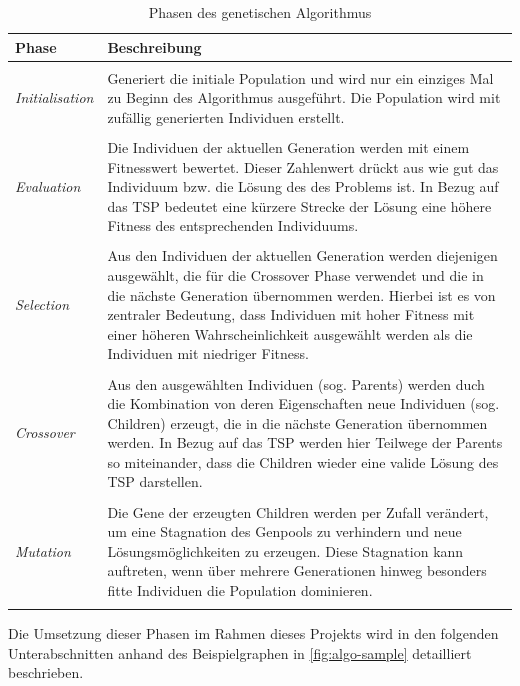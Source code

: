 \documentclass[12pt,a4paper]{scrreprt}
\begin{document}
\begin{center}
\begin{longtable}{p{3.0cm} p{10cm}}

Phase & Beschreibung \\
\hline \\
\textit{Initialisation} & Generiert die initiale Population und wird nur ein einziges Mal zu Beginn des Algorithmus ausgeführt. Die Population wird mit zufällig generierten Individuen erstellt.\\
 & \\
\textit{Evaluation} &  Die Individuen der aktuellen Generation werden mit einem Fitnesswert bewertet. Dieser Zahlenwert drückt aus wie gut das Individuum bzw. die Lösung des des Problems ist. In Bezug auf das TSP bedeutet eine kürzere Strecke der Lösung eine höhere Fitness des entsprechenden Individuums.\\
 & \\
\textit{Selection} & Aus den Individuen der aktuellen Generation werden diejenigen ausgewählt, die für die Crossover Phase verwendet und die in die nächste Generation übernommen werden. Hierbei ist es von zentraler Bedeutung, dass Individuen mit hoher Fitness mit einer höheren Wahrscheinlichkeit ausgewählt werden als die Individuen mit niedriger Fitness.\\
 & \\
\textit{Crossover} & Aus den ausgewählten Individuen (sog. Parents) werden duch die Kombination von deren Eigenschaften neue Individuen (sog. Children) erzeugt, die in die nächste Generation übernommen werden. In Bezug auf das TSP werden hier Teilwege der Parents so miteinander, dass die Children wieder eine valide Lösung des TSP darstellen.\\
 & \\
\textit{Mutation} & Die Gene der erzeugten Children werden per Zufall verändert, um eine Stagnation des Genpools zu verhindern und neue Lösungsmöglichkeiten zu erzeugen. Diese Stagnation kann auftreten, wenn über mehrere Generationen hinweg besonders fitte Individuen die Population dominieren.\\

\caption{Phasen des genetischen Algorithmus}
\label{tbl:phasen-algorithmus}
\end{longtable}
\end{center}

Die Umsetzung dieser Phasen im Rahmen dieses Projekts wird in den folgenden Unterabschnitten anhand des Beispielgraphen in \autoref{fig:algo-sample} detailliert beschrieben.
\end{document}
